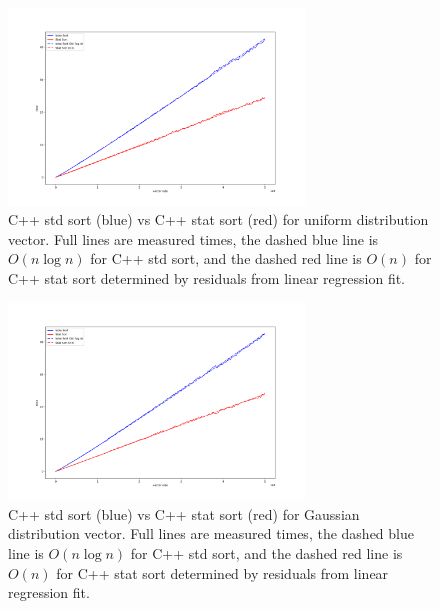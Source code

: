\documentclass[12pt]{article}
\begin{document}
		\begin{figure}
		\begin{center}
			\includegraphics[width=0.7\textwidth]{fig_perf_norm}
		\end{center}
			\caption{C++ std sort (blue) vs C++ stat sort (red) for uniform distribution vector. Full lines are measured times, the dashed blue line is $O(n \log n)$ for C++ std sort, and the dashed red line is $O(n)$ for C++ stat sort determined by residuals from linear regression fit.}
		
		\label{fig1}
		\end{figure}		

		\begin{figure}
		\begin{center}
			\includegraphics[width=0.7\textwidth]{fig_perf_gauss}
		\end{center}
			\caption{C++ std sort (blue) vs C++ stat sort (red) for Gaussian distribution vector. Full lines are measured times, the dashed blue line is $O(n \log n)$ for C++ std sort, and the dashed red line is $O(n)$ for C++ stat sort determined by residuals from linear regression fit.}
		
		\label{fig2}
		\end{figure}		
\end{document}
